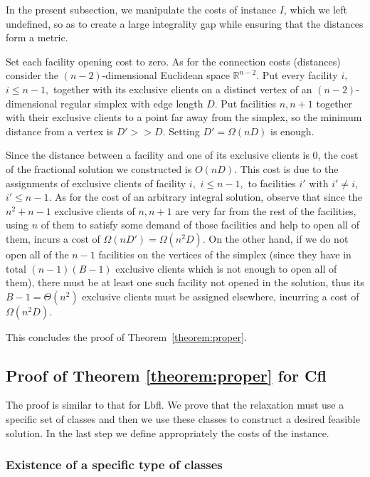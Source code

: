 \documentclass[11pt]{article}
\newcommand{\lbfl}{{\sc Lbfl}}
\newcommand{\cfl}{{\sc Cfl}}
\begin{document}
In the  present subsection, we  manipulate the costs of  instance $I$,
which we left undefined, so as to create a large integrality gap while
ensuring that the distances form a metric.

Set each facility opening cost to zero. As for the connection costs (distances)
consider the $(n-2)$-dimensional Euclidean space $\mathbb{R}^{n-2}$. Put
every facility $i,$  $i\leq n-1,$ together with its  exclusive clients on a
distinct vertex of an $(n-2)$-dimensional regular simplex with edge length
$D$. Put facilities $n,n+1$ together with their exclusive clients to a point
far away  from the simplex, so  the minimum distance from  a vertex is
$D' >> D.$ Setting $D'=\Omega(nD)$ is enough.

Since the distance between a facility and one of its exclusive clients
is  $0$,  the  cost  of  the fractional  solution  we  constructed  is
$O(nD)$. This cost  is due to the assignments  of exclusive clients of
facility $i,$ $i \leq n-1,$ to facilities $i'$ with $i' \neq i,$ $i' \leq n-1.$ 
As  for the cost  of an arbitrary integral  solution, observe
that since the $n^2+n-1$ exclusive  clients of $n,n+1$ are very far from
the  rest of  the facilities,  using $n$  of them  to  satisfy some
demand of  those facilities and help  to open all of  them, incurs a
cost of $\Omega(nD') = \Omega(n^2D).$ On the other hand, if we do not open all of the $n-1$
facilities on  the vertices of the  simplex (since they  have in total
$(n-1)(B-1)$  exclusive clients  which is  not enough  to open  all of
them), there  must be  at least  one such facility  not opened  in the
solution, thus its $B-1=\Theta(n^2)$ exclusive clients must be assigned elsewhere,
incurring a cost of  $\Omega(n^2D).$

This concludes the proof of Theorem~\ref{theorem:proper}. 




\subsection{Proof of Theorem \ref{theorem:proper} for \cfl\ } 
\label{sec:proof_theorem_p2}

The proof is similar to that for \lbfl. 
We prove that the relaxation must use 
a specific set of classes and then we use these classes to construct a
desired feasible solution. In the last step we 
 define appropriately  the costs of the instance. 

\subsubsection{Existence of a specific type of classes}
\end{document}
